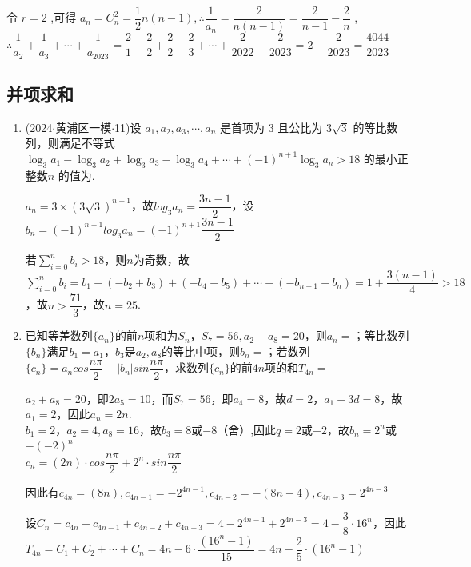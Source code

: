 \begin{enumerate}
\begin{jieda}
        令 $r = 2$ ,可得 ${a}_n = {{C}}_n^2 = \dfrac{1}{2}n\left( {n - 1}\right) ,\therefore \dfrac{1}{{a}_n} = \dfrac{2}{n\left( {n - 1}\right) } = \dfrac{2}{n - 1} - \dfrac{2}{n}$ , $\therefore \dfrac{1}{{a}_2} + \dfrac{1}{{a}_3} + \cdots  + \dfrac{1}{{a}_{2023}} = \dfrac{2}{1} - \dfrac{2}{2} + \dfrac{2}{2} - \dfrac{2}{3} + \cdots  + \dfrac{2}{2022} - \dfrac{2}{2023} = 2 - \dfrac{2}{2023} = \dfrac{4044}{2023}$
    \end{jieda}
\end{enumerate}
\subsection*{并项求和}
\begin{enumerate}
    \item (2024$\cdot$黄浦区一模$\cdot$11)设 ${a}_{1},{a}_{2},{a}_{3},\cdots ,{a}_{n}$ 是首项为 3 且公比为 $3\sqrt{3}$ 的等比数列，则满足不等式 ${\log }_{3}{a}_{1} - {\log }_{3}{a}_{2} + {\log }_{3}{a}_{3} - {\log }_{3}{a}_{4} + \cdots  + {\left( -1\right) }^{n + 1}{\log }_{3}{a}_{n} > {18}$ 的最小正整数$n$ 的值为.
    \begin{jieda}
        $a_n = 3 \times (3\sqrt{3})^{n-1}$，故$log_3{a_n} = \dfrac{3n-1}{2}$，设$b_n = (-1)^{n+1}log_3a_n = (-1)^{n+1}\dfrac{3n-1}{2}$

        若$\mathop{\sum }\limits_{{i = 0}}^{n} b_i > 18$，则$n$为奇数，故$\mathop{\sum }\limits_{{i = 0}}^{n} b_i = {b}_{1} + \left( {-{b}_{2} + {b}_{3}}\right)  + \left( {-{b}_{4} + {b}_{5}}\right)  + \cdots  + \left(-{b}_{n-1} +  {b}_{n}\right)  = 1 + \dfrac{3(n-1)}{4} > {18}$，故$n > \dfrac{71}{3}$，故$n=25$.
    \end{jieda}
    \item 已知等差数列$\{a_n\}$的前$n$项和为$S_n$，$S_7 = 56, a_2 + a_8 = 20$，则$a_n = $；等比数列$\{b_n\}$满足$b_1 = a_1$，$b_3$是$a_2, a_8$的等比中项，则$b_n = $；若数列$\{c_n\} = a_n cos\dfrac{n\pi}{2} + |b_n|sin\dfrac{n\pi}{2}$，求数列$\{c_n\}$的前$4n$项的和$T_{4n} = $
    \begin{jieda}
        $a_2 + a_8 = 20$，即$2a_5 = 10$，而$S_7 = 56$，即$a_4=8$，故$d = 2$，$a_1 + 3d = 8$，故$a_1 = 2$，因此$a_n = 2n$. \\
        $b_1 = 2$，$a_2 = 4, a_8 = 16$，故$b_3 = 8$或$-8$（舍）,因此$q = 2$或$-2$，故$b_n = 2^n$或$-(-2)^n$ \\
        $c_n = (2n) \cdot cos\dfrac{n\pi}{2} + 2^n \cdot sin\dfrac{n\pi}{2}$
        
        因此有$c_{4n} = (8n), c_{4n-1} = -2^{4n-1}, c_{4n-2} = -(8n-4), c_{4n-3} = 2^{4n-3}$
        
        设$C_n = c_{4n} + c_{4n-1} + c_{4n-2} + c_{4n-3} = 4 - 2^{4n-1} + 2^{4n-3} = 4 - \dfrac{3}{8} \cdot 16^n$，因此$T_{4n} = C_1 + C_2 + \cdots + C_n = 4n - 6 \cdot \dfrac{(16^n - 1)}{15} = 4n - \dfrac{2}{5} \cdot (16^n - 1)$
    \end{jieda}
\end{enumerate}
